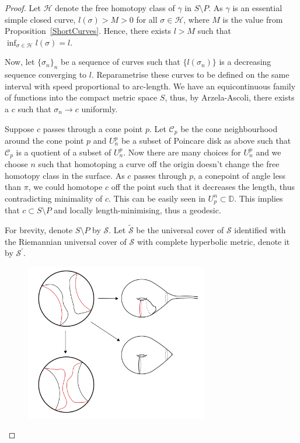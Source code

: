 \begin{proof}
	Let $\mathscr{H}$ denote the free homotopy class of $\gamma$ in $S \setminus P$. As $\gamma$ is an essential simple closed curve, $l(\sigma) > M > 0$ for all $\sigma \in \mathscr{H}$, where $M$ is the value from Proposition~\ref{ShortCurves}. Hence, there exists $l > M$ such that $\inf_{\sigma \in \mathscr{H}} l(\sigma) = l $. 
	
	Now, let $\{\sigma_n\}_n$ be a sequence of curves such that $\{l(\sigma_n)\}$ is a decreasing sequence converging to $l$. Reparametrise these curves to be defined on the same interval with speed proportional to arc-length. We have an equicontinuous family of functions into the compact metric space $S$, thus, by Arzela-Ascoli, there exists a $c$ such that $\sigma_n \rightarrow c$ uniformly. 
	
	Suppose $c$ passes through a cone point $p$. Let $\mathcal{C}_p$ be the cone neighbourhood around the cone point $p$ and $U^p_n$ be a subset of Poincare disk as above such that $\mathcal{C}_p$ is a quotient of a subset of $U^p_n$. Now there are many choices for $U^p_n$ and we choose $n$ such that homotoping a curve off the origin doesn't change the free homotopy class in the surface. As $c$ passes through $p$, a conepoint of angle less than $\pi$, we could homotope $c$ off the point such that it decreases the length, thus contradicting minimality of $c$. This can be easily seen in $U_p^n \subset \mathbb{D}$. This implies that $c \subset S \setminus P$ and locally length-minimising, thus a geodesic.	
	
	For brevity, denote $S \setminus P$ by $\mathcal{S}$. Let $\widetilde{\mathcal{S}}$ be the universal cover of $\mathcal{S}$ identified with the Riemannian universal cover of $\mathcal{S}$ with complete hyperbolic metric, denote it by $\mathcal{S}^\prime$.
	
	\begin{figure}[h]
		\includegraphics[width=8cm]{Chapter1/simplicity.pdf}
		\caption{}
		\label{fig:simplicity}
	\end{figure}
	  

\end{proof}
